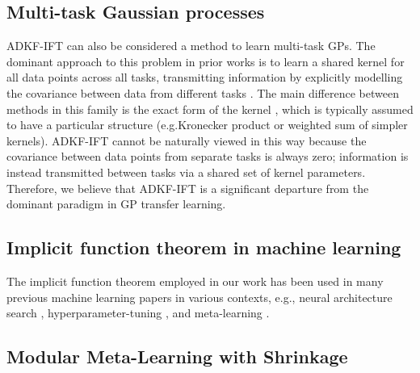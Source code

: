     \subsection{Multi-task Gaussian processes}
    ADKF-IFT can also be considered a method to learn multi-task GPs.
    The dominant approach to this problem in prior works is to learn a shared kernel for all data points across all tasks,
    transmitting information by explicitly modelling the covariance between data from different tasks
    \citep{kennedy2000predicting,forrester2007multi,bonilla2007multi,swersky2013multi,poloczek2017multi}.
    The main difference between methods in this family is the exact form of the kernel \citep{tighineanu2022transfer},
    which is typically assumed to have a particular structure (e.g.\@ Kronecker product or weighted sum of simpler kernels).
    ADKF-IFT cannot be naturally viewed in this way because the covariance
    between data points from separate tasks is always zero;
    information is instead transmitted between tasks via a shared set of
    kernel parameters.
    Therefore, we believe that ADKF-IFT is a significant departure from
    the dominant paradigm in GP transfer learning.
    
    \subsection{Implicit function theorem in machine learning}
    
    The implicit function theorem employed in our work has been used in many previous machine learning papers in various contexts, e.g., neural architecture search \citep{zhang2021idarts}, hyperparameter-tuning \citep{bengio2000gradient,luketina16,Pedregosa16hyper,lorraine20a,clarke2022scalable}, and meta-learning \citep{Rajeswaran2019iMAML,Lee_2019_CVPR,chen2020modular}.
    
    \subsection{Modular Meta-Learning with Shrinkage \citep{chen2020modular}}
    
